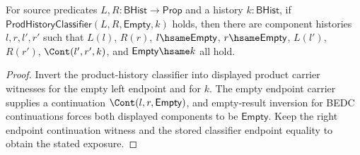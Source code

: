 \begin{theorem}
\label{thm:prod-history-classifier-empty-left-component-inversion}
For source predicates $L,R:\mathsf{BHist}\to\mathsf{Prop}$ and a history
$k:\mathsf{BHist}$, if
$\mathsf{ProdHistoryClassifier}(L,R,\mathsf{Empty},k)$ holds, then there are
component histories $l,r,l',r'$ such that $L(l)$, $R(r)$,
$l\hsame\mathsf{Empty}$, $r\hsame\mathsf{Empty}$, $L(l')$, $R(r')$,
$\Cont(l',r',k)$, and $\mathsf{Empty}\hsame k$ all hold.
\end{theorem}
\begin{proof}
Invert the product-history classifier into displayed product carrier witnesses
for the empty left endpoint and for $k$. The empty endpoint carrier supplies a
continuation $\Cont(l,r,\mathsf{Empty})$, and empty-result inversion for BEDC
continuations forces both displayed components to be $\mathsf{Empty}$. Keep the
right endpoint continuation witness and the stored classifier endpoint equality
to obtain the stated exposure.
\end{proof}
